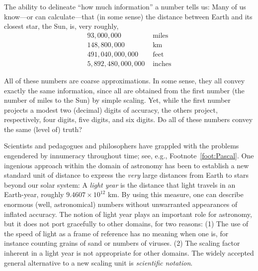 The ability to delineate ``how much information'' a number tells us:
Many of us know---or can calculate---that (in some sense) the distance
between Earth and its closest star, the Sun, is, very roughly,
\[ \begin{array}{rl}
93,000,000 & \mbox{ miles} \\
148,800,000 & \mbox{ km} \\
491,040,000,000 & \mbox{ feet} \\
5,892,480,000,000 & \mbox{ inches}
\end{array}
\]

\medskip

\noindent {}

\medskip

All of these numbers are coarse approximations.  In some sense, they
all convey exactly the same information, since all are obtained from
the first number (the number of miles to the Sun) by simple scaling.
Yet, while the first number projects a modest two (decimal) digits of
accuracy, the others project, respectively, four digits, five digits,
and six digits.  Do all of these numbers convey the same (level of)
truth?

\medskip

Scientists and pedagogues and philosophers have grappled with the
problems engendered by innumeracy throughout time; see, e.g.,
Footnote~\ref{foot:Pascal}.  One ingenious approach within the domain
of astronomy has been to establish a new standard unit of distance to
express the {\em very} large distances from Earth to stars beyond our
solar system: A {\em light year} is the distance that light travels in
an Earth-year, roughly $9.4607 \times 10^{12}$ km.  By using this
measure, one can describe enormous (well, astronomical) numbers
without unwarranted appearances of inflated accuracy.  The notion of
light year plays an important role for astronomy, but it does not port
gracefully to other domains, for two reasons: (1) The use of the speed
of light as a frame of reference has no meaning when one is, for
instance counting grains of sand or numbers of viruses.  (2) The
scaling factor inherent in a light year is not appropriate for other
domains.  The widely accepted general alternative to a new scaling
unit is {\em scientific notation}.  

